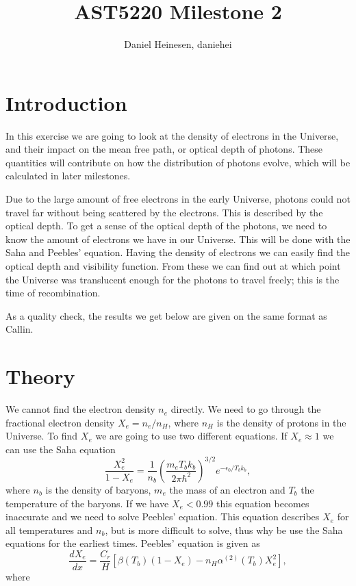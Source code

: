 \documentclass[a4paper,norsk, 10pt]{article}
\title{AST5220 Milestone 2}
\author{Daniel Heinesen, daniehei}
\begin{document}
\maketitle
\section{Introduction}
In this exercise we are going to look at the density of electrons in the Universe, and their impact on the mean free path, or optical depth of photons. These quantities will contribute on how the distribution of photons evolve, which will be calculated in later milestones.

Due to the large amount of free electrons in the early Universe, photons could not travel far without being scattered by the electrons. This is described by the optical depth. To get a sense of the optical depth of the photons, we need to know the amount of electrons we have in our Universe. This will be done with the Saha and Peebles' equation. Having the density of electrons we can easily find the optical depth and visibility function. From these we can find out at which point the Universe was translucent enough for the photons to travel freely; this is the time of recombination.

As a quality check, the results we get below are given on the same format as Callin\cite{callin}.

\section{Theory}
We cannot find the electron density $n_e$ directly. We need to go through the fractional electron density $X_e = n_e/n_H$, where $n_H$ is the density of protons in the Universe. To find $X_e$ we are going to use two different equations. If $X_e \approx 1$ we can use the Saha equation
\begin{equation}\label{eq:saha}
\frac{X_e^2}{1-X_e} = \frac{1}{n_b}\left(\frac{m_e T_b k_b}{2\pi \hbar^2}\right)^{3/2} e^{-\epsilon_0/T_b k_b},
\end{equation}
where $n_b$ is the density of baryons, $m_e$ the mass of an electron and $T_b$ the temperature of the baryons. If we have $X_e < 0.99$ this equation becomes inaccurate and we need to solve Peebles' equation. This equation describes $X_e$ for all temperatures and $n_b$, but is more difficult to solve, thus why be use the Saha equations for the earliest times. Peebles' equation is given as
\begin{equation}\label{eq:peebles}
\frac{dX_e}{dx} = \frac{C_r}{H}\left[\beta (T_b)(1-X_e) - n_H \alpha^{(2)}(T_b)X_e^2 \right],
\end{equation}
where
\end{document}
